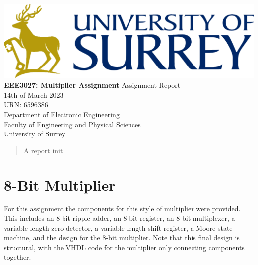 \documentclass[11pt]{article}
\begin{document}
\begin{titlepage}
    \begin{center}
    \includegraphics[width=\textwidth]{Logo.png} %
    \vfill
    \Huge
    \textbf{EEE3027: Multiplier Assignment}
    \vfill
    \huge
    Assignment Report\\
    \vspace{1cm}
    \Large
    14th of March 2023\\
    URN: 6596386\\
    \vfill
    \vfill
    \Large
    Department of Electronic Engineering\\
    Faculty of Engineering and Physical Sciences\\
    University of Surrey\\
    \end{center}
\end{titlepage}

\begin{abstract}
A report init

\vspace{1cm}
\end{abstract}
\tableofcontents
\pagebreak

\section{8-Bit Multiplier}
For this assignment the components for this style of multiplier were provided.
This includes an 8-bit ripple adder, an 8-bit register, an 8-bit multiplexer, a variable length zero detector, a variable length shift register, a Moore state machine,
and the design for the 8-bit multiplier.
Note that this final design is structural, with the VHDL code for the multiplier only connecting components together.
\end{document}
